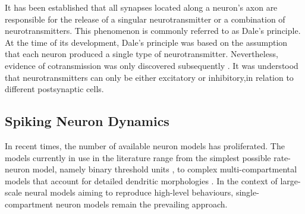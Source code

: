


\noindent It has been established that all synapses located along a neuron's axon are responsible for the release of a singular neurotransmitter or a combination of neurotransmitters. This phenomenon is commonly referred to as Dale's principle. At the time of its development, Dale's principle was based on the assumption that each neuron produced a single type of neurotransmitter. Nevertheless, evidence of cotransmission was only discovered subsequently \cite{burnstock2004cotransmission}. It was understood that neurotransmitters can only be either excitatory or inhibitory,in relation to different postsynaptic cells.

\subsection[Spiking Neuron Dynamics]{Spiking Neuron Dynamics}

\noindent In recent times, the number of available neuron models has proliferated. The models currently in use in the literature range from the simplest possible rate-neuron model, namely binary threshold units \cite{stocks2001information}, to complex multi-compartmental models that account for detailed dendritic morphologies \cite{markram2015reconstruction}. In the context of large-scale neural models aiming to reproduce high-level behaviours, single-compartment neuron models remain the prevailing approach. \\

